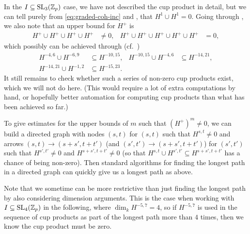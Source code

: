 In the $I \subseteq \operatorname{SL}_{3}(\mathbb{Z}_{p})$ case, we have not described the cup product in detail, but we can tell purely from \eqref{eq:graded-coh-inc} and , that $H^{1} \cup H^{1} = 0$. Going through , we also note that an upper bound for $H^{+}$ is
\begin{align*}
  H^{+} \cup H^{+} \cup H^{+} \cup H^{+} &\neq 0, & H^{+} \cup H^{+} \cup H^{+} \cup H^{+} \cup H^{+} &= 0,
\end{align*}
which possibly can be achieved through (cf.\ \cite{code})
\begin{align*}
  H^{-4,6} \cup H^{-6,9} &\subseteq H^{-10,15}, & H^{-10,15} \cup H^{-4,6} &\subseteq H^{-14,21}, \\
  H^{-14,21} \cup H^{-1,2} &\subseteq H^{-15,23}.
\end{align*}
It still remains to check whether such a series of non-zero cup products exist, which we will not do here. (This would require a lot of extra computations by hand, or hopefully better automation for computing cup products than what has been achieved so far.)

\begin{remark}
  To give estimates for the upper bounds of $m$ such that $(H^{+})^{m} \neq 0$, we can build a directed graph with nodes $(s,t)$ for $(s,t)$ such that $H^{s,t} \neq 0$ and arrows $(s,t) \to (s+s',t+t')$ (and $(s',t') \to (s+s',t+t')$) for $(s',t')$ such that $H^{s',t'} \neq 0$ and $H^{s+s',t+t'} \neq 0$ (so that $H^{s,t} \cup H^{s',t'} \subseteq H^{s+s',t+t'}$ has a chance of being non-zero). Then standard algorithms for finding the longest path in a directed graph can quickly give us a longest path as above.

  Note that we sometime can be more restrictive than just finding the longest path by also considering dimension arguments. This is the case when working with $I \subseteq \operatorname{SL}_{4}(\mathbb{Z}_{p})$ in the following, where $\dim_{k} H^{-5,7} = 4$, so if $H^{-5,7}$ is used in the sequence of cup products as part of the longest path more than $4$ times, then we know the cup product must be zero.
\end{remark}

